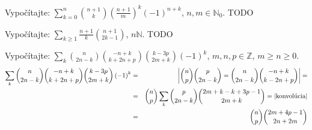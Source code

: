 \pr Vypočítajte: $\sum_{k=0}^{n}{n+1 \choose k}\left(\frac{n+1}m\right)^k \left(-1\right)^{n+k}$, $n,m\in\mathbb{N}_0$.
\ries{} TODO

\pr Vypočítajte: $\sum_{k\geq1}\frac{n+1}k{n+1 \choose 2k-1}$, $n\mathbb{N}$.
\ries{} TODO

\pr Vypočítajte: $\sum_k{n \choose 2n-k}{-n+k \choose k+2n+p}{k-3p \choose 2m+k}\left(-1\right)^k$, $m,n,p\in\mathbb{Z}$, $m\geq n\geq 0$.
\begin{eqnarray*}
\sum_k{n \choose 2n-k}{-n+k \choose k+2n+p}{k-3p \choose 2m+k}\left(-1\right)^k &=& \left| {n \choose p}{p \choose 2n-k} = {n \choose 2n-k}{-n+k \choose k-2n+p}\right| = \\
&=& {n \choose p}\sum_k{p \choose 2n-k}{2m+k-k+3p-1 \choose 2m+k} = |\hbox{konvolúcia}|\\
&=& {n \choose p}{2m+4p-1 \choose 2n+2m}
\end{eqnarray*}
